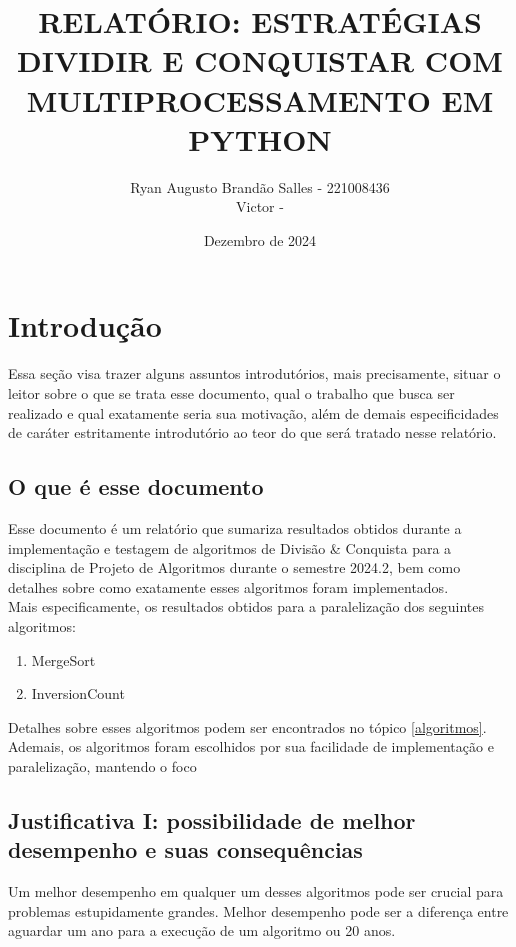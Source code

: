 \documentclass{article}
\title{RELATÓRIO: ESTRATÉGIAS DIVIDIR E CONQUISTAR COM MULTIPROCESSAMENTO EM PYTHON}
\author{
    Ryan Augusto Brandão Salles - 221008436\\
    Victor - 
}
\date{Dezembro de 2024}
\begin{document}
\maketitle

\section{Introdução}
Essa seção visa trazer alguns assuntos introdutórios, mais precisamente, situar o leitor sobre o que se trata esse documento, qual o trabalho que busca ser realizado e qual exatamente seria sua motivação, além de demais especificidades de caráter estritamente introdutório ao teor do que será tratado nesse relatório.

\subsection{O que é esse documento}
Esse documento é um relatório que sumariza resultados obtidos durante a implementação e testagem de algoritmos de Divisão \& Conquista para a disciplina de Projeto de Algoritmos durante o semestre 2024.2, bem como detalhes sobre como exatamente esses algoritmos foram implementados.\\
Mais especificamente, os resultados obtidos para a paralelização dos seguintes algoritmos:
    \begin{enumerate}
        \item MergeSort
        \item InversionCount
    \end{enumerate}
Detalhes sobre esses algoritmos podem ser encontrados no tópico \ref{algoritmos}.\\
Ademais, os algoritmos foram escolhidos por sua facilidade de implementação e paralelização, mantendo o foco 
\subsection{Justificativa I: possibilidade de melhor desempenho e suas consequências}
Um melhor desempenho em qualquer um desses algoritmos pode ser crucial para problemas estupidamente grandes. Melhor desempenho pode ser a diferença entre aguardar um ano para a execução de um algoritmo ou 20 anos. 
\end{document}
